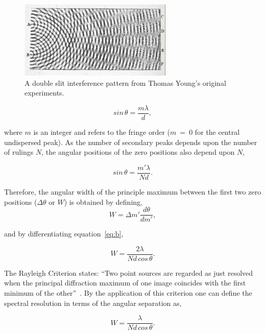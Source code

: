 \begin{figure}
 \centering
 \includegraphics[width=0.65\textwidth]{kmos/youngslits}
 \caption[Double slit interference pattern]{A double slit interference pattern from Thomas Young's original experiments.
 \label{fig:doubleslit}}
\end{figure}


\begin{equation}
    sin\,\theta = \frac{m\lambda}{d},\label{eq:a}
\end{equation}

\noindent where $m$ is an integer and refers to the fringe order ($m$~=~0 for the central undispersed peak).
As the number of secondary peaks depends upon the number of rulings $N$, the angular positions of the zero positions also depend upon $N$,

\begin{equation}
    sin\,\theta = \frac{m'\lambda}{Nd}.\label{eq:b}
\end{equation}

\noindent Therefore, the angular width of the principle maximum between the first two zero positions ($\Delta\theta$ or $W$) is obtained by defining,
\begin{equation}
     W = \Delta m'\frac{d\theta}{dm'},\label{eq:c}
\end{equation}

\noindent and by differentiating equation~\ref{eq:b},

\begin{equation}
    W = \frac{2\lambda}{Nd\,cos\,\theta}.\label{eq:d}
\end{equation}

\noindent The Rayleigh Criterion states: ``Two point sources are regarded as just resolved when the principal diffraction maximum of one image coincides with the first minimum of the other''~\citep{1880MNRAS..40..254R}.
By the application of this criterion one can define the spectral resolution in terms of the angular separation as,

\begin{equation}
    W = \frac{\lambda}{Nd\,cos\,\theta}.\label{eq:e}
\end{equation}

